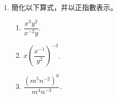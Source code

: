 \documentclass[11pt]{article}
\begin{document}
\begin{enumerate}
            \hrulefill
            
            \hrulefill
            
            \hrulefill
            
            \hrulefill
            
            \hrulefill
            
            \hrulefill
            
            \hrulefill
            
            \hrulefill
            
            \hrulefill
            
            \hrulefill
            
            \hrulefill

            \hrulefill
            
            \hrulefill
            
            \hrulefill
            
            \hrulefill

            \hrulefill
            
            \hrulefill
            
            \hrulefill
            
            \hrulefill
            
            \hrulefill

        \pagebreak
        \item 簡化以下算式，并以正指數表示。\begin{enumerate}
            \item $\dfrac{x^3y^2}{x^{-3}y}$.
            \item $x(\dfrac{x^{-1}}{y^2})^{-3}$.
            \item $\dfrac{(m^5n^{-2})^6}{m^4n^{-3}}$.
        \end{enumerate}

        \hrulefill
            
            \hrulefill
            
            \hrulefill
            
            \hrulefill
            
            \hrulefill
            
            \hrulefill
            
            \hrulefill
            
            \hrulefill
            

\end{enumerate}
\end{document}
